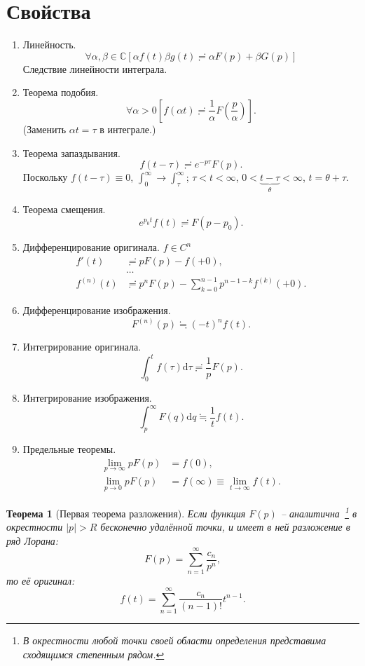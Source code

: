 \documentclass[12pt]{report}
\renewcommand{\C}{\mathbb C}
\newcommand{\rd}{\mathrm d}
\newtheorem{thm}{Теорема}
\begin{document}
\section{Свойства~\cite{Dubkov:Lecture}}
\begin{enumerate}
	\item Линейность.
	\[
	\forall\alpha,\beta\in\C\left[\alpha f(t)\beta g(t) \risingdotseq \alpha F(p) + \beta G(p)\right]
	\]
	Следствие линейности интеграла.
	\item Теорема подобия.
	\[
	\forall\alpha>0 \left[f(\alpha t) \risingdotseq \frac 1\alpha F\left(\frac p\alpha\right) \right].
	\]
	(Заменить $\alpha t = \tau$ в интеграле.)
	\item Теорема запаздывания.
	\[
	f(t-\tau) \risingdotseq e^{-p\tau} F(p).
	\]
	Поскольку $f(t-\tau) \equiv 0$, $\int_0^\infty \to \int_\tau^\infty$; $\tau < t < \infty$, 
	$0 < \underbrace{t-\tau}_{\theta} < \infty$, $t = \theta + \tau$.
	\item Теорема смещения.
	\[
	e^{p_0t} f(t) \risingdotseq F(p-p_0).
	\]
	\item Дифференцирование оригинала. $f\in C^n$ \label{itm:prop-diff-original}
	\begin{align*}
	f'(t) &\risingdotseq p F(p) - f(+0), \\
	&\dots \\
	f^{(n)}(t) &\risingdotseq p^nF(p) -\sum_{k=0}^{n-1}p^{n-1-k}f^{(k)}(+0).
	\end{align*}
	\item Дифференцирование изображения.
	\[
	F^{(n)}(p) \fallingdotseq (-t)^nf(t).
	\]
	\item  Интегрирование оригинала.
	\[
	\int_0^t f(\tau)\rd\tau \risingdotseq \frac 1p F(p).
	\]
	\item Интегрирование изображения.
	\[
	\int_p^\infty F(q)\rd q \fallingdotseq \frac 1t f(t).
	\]
	\item Предельные теоремы.
	\begin{align*}
		\lim\limits_{p\to \infty} pF(p) &= f(0),\\
		\lim\limits_{p\to0} pF(p) &= f(\infty) \equiv \lim_{t\to\infty}f(t).
	\end{align*}
\end{enumerate}

\begin{thm}[Первая теорема разложения]
	Если функция $F(p)$ -- аналитична~\footnote{В окрестности любой точки своей области определения представима сходящимся степенным рядом.} в окрестности $|p|>R$ бесконечно удалённой точки, и имеет в ней разложение в ряд Лорана:
	\[
	F(p) = \sum_{n=1}^{\infty}\frac{c_n}{p^n},
	\]
	то её оригинал:
	\[
	f(t) = \sum_{n=1}^{\infty}\frac{c_n}{(n-1)!}t^{n-1}.
	\]
\end{thm}
\end{document}

